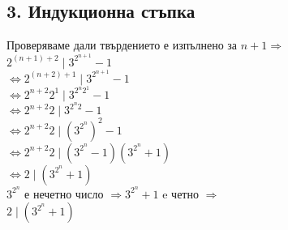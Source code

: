 \documentclass[12pt]{article}
\begin{document}
\subsection*{3. Индукционна стъпка}
Проверяваме дали твърдението е изпълнено за $n+1 \Rightarrow$\\
$2^{(n + 1) + 2} \mid 3^{2^{n + 1}} - 1$\\
$\Leftrightarrow 2^{(n + 2) + 1} \mid 3^{2^{n + 1}} - 1$\\
$\Leftrightarrow 2^{n + 2}2^1 \mid 3^{2^n2^1} - 1$\\
$\Leftrightarrow 2^{n + 2}2 \mid 3^{2^n2} - 1$\\
$\Leftrightarrow 2^{n + 2}2 \mid (3^{2^n})^2 - 1$\\
$\Leftrightarrow 2^{n + 2}2 \mid (3^{2^n} - 1)(3^{2^n} + 1)$\\
$\Leftrightarrow 2 \mid (3^{2^n} + 1)$\\
$3^{2^n}$ е нечетно число $\Rightarrow 3^{2^n} + 1$ e четно $\Rightarrow$\\
$2 \mid (3^{2^n} + 1)$
\end{document}
